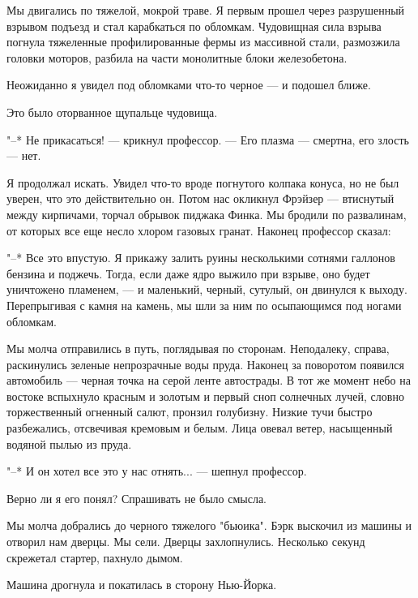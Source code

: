 Мы  двигались  по  тяжелой,  мокрой  траве.  Я  первым   прошел   через
разрушенный взрывом подъезд и стал  карабкаться  по  обломкам.  Чудовищная
сила взрыва погнула тяжеленные профилированные фермы из  массивной  стали,
размозжила  головки   моторов,   разбила   на   части   монолитные   блоки
железобетона.

Неожиданно я увидел под обломками что-то черное --- и подошел ближе.

Это было оторванное щупальце чудовища.

"--* Не прикасаться! --- крикнул профессор. ---  Его  плазма  ---  смертна,  его
злость --- нет.

Я продолжал искать. Увидел что-то вроде погнутого колпака конуса, но не
был уверен, что  это  действительно  он.  Потом  нас  окликнул  Фрэйзер  ---
втиснутый между кирпичами, торчал обрывок пиджака  Финка.  Мы  бродили  по
развалинам, от которых  все  еще  несло  хлором  газовых  гранат.  Наконец
профессор сказал:

"--* Все это впустую. Я прикажу залить руины несколькими сотнями  галлонов
бензина и поджечь. Тогда, если даже ядро  выжило  при  взрыве,  оно  будет
уничтожено пламенем, --- и маленький, черный, сутулый, он двинулся к выходу.
Перепрыгивая с камня на камень, мы шли за ним по  осыпающимся  под  ногами
обломкам.

\bigskip{}



Мы молча  отправились  в  путь,  поглядывая  по  сторонам.  Неподалеку,
справа, раскинулись зеленые непрозрачные воды пруда. Наконец за  поворотом
появился автомобиль --- черная точка на серой ленте  автострады.  В  тот  же
момент небо на востоке вспыхнуло красным и золотым и первый сноп солнечных
лучей, словно торжественный огненный салют, пронзил голубизну. Низкие тучи
быстро разбежались,  отсвечивая  кремовым  и  белым.  Лица  овевал  ветер,
насыщенный водяной пылью из пруда.

"--* И он хотел все это у нас отнять... --- шепнул профессор.

Верно ли я его понял? Спрашивать не было смысла.

Мы молча добрались до  черного  тяжелого  "бьюика".  Бэрк  выскочил  из
машины и отворил нам  дверцы.  Мы  сели.  Дверцы  захлопнулись.  Несколько
секунд скрежетал стартер, пахнуло дымом.

Машина дрогнула и покатилась в сторону Нью-Йорка.
